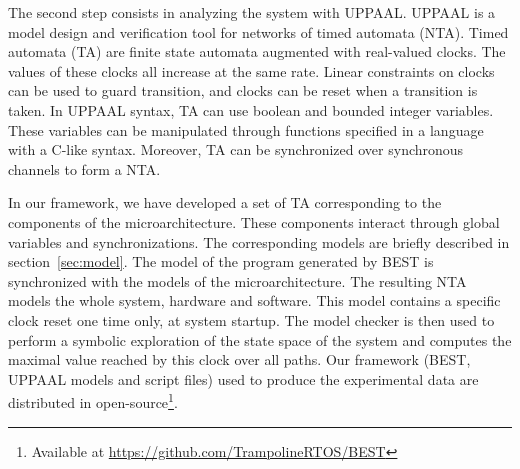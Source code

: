 
The second step consists in analyzing the system with UPPAAL.
UPPAAL is a model design and verification tool for networks of timed automata (NTA).
Timed automata (TA) are finite state automata augmented with real-valued clocks.
The values of these clocks all increase at the same rate.
Linear constraints on clocks can be used to guard transition, and clocks can be reset when a transition is taken.
In UPPAAL syntax, TA can use boolean and bounded integer variables.
These variables can be manipulated through functions specified in a language with a C-like syntax.
Moreover, TA can be synchronized over synchronous %
 channels to form a NTA.

In our framework, we have developed a set of TA corresponding to the components of the microarchitecture. %
These components interact through global variables and synchronizations.
The corresponding models are briefly described in section~\ref{sec:model}.
The model of the program generated by BEST is synchronized with the models of the microarchitecture.
The resulting NTA models the whole system, hardware and software.
This model contains a specific clock reset one time only, at system startup. 
The model checker is then used to perform a symbolic exploration of the state space of the system and computes the maximal value reached by this clock over all paths.
  Our framework (BEST, UPPAAL models and script files) used to produce the experimental data are distributed in open-source\footnote{Available at
  \url{https://github.com/TrampolineRTOS/BEST}}.





